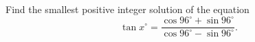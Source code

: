 Find the smallest positive integer solution of the equation \[\tan{x^{\circ}}=\dfrac{\cos{96^{\circ}}+\sin{96^{\circ}}}{\cos{96^{\circ}}-\sin{96^{\circ}}}.\]
